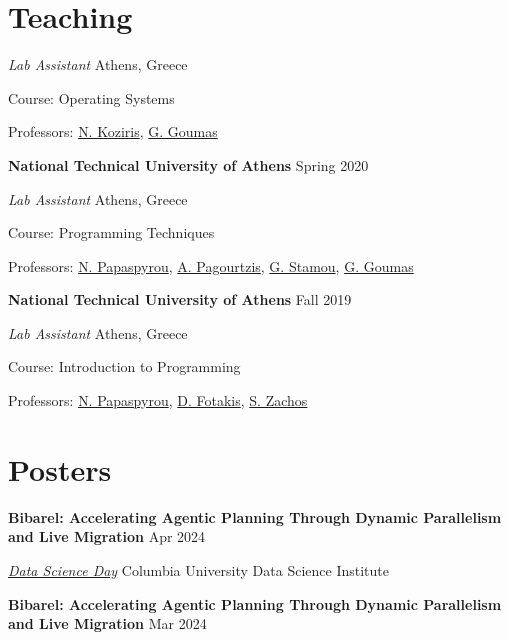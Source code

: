 \documentclass[margin,12pt]{resume}
\newcommand{\subsectionVSpace}{\vspace{3.5ex}\xspace}
\newcommand{\sectionVSpace}{\vspace{1ex}\xspace} %
\newcommand{\sectionVSpaceCorrection}{\vspace{-3.5ex}} %
\newcommand{\header}[1]{\textbf{#1}\xspace}
\newcommand{\event}[1]{\textit{#1}\xspace}
\newcommand{\institution}[1]{\header{#1}\xspace}
\newcommand{\place}[1]{#1\xspace}
\newcommand{\poster}[1]{\header{#1}\xspace}
\newcommand{\role}[1]{\textit{#1}\xspace}
\newcommand{\singleDate}[1]{#1\xspace}
\newcommand{\stitle}[1]{#1:\xspace}
\newenvironment{rSubsection}{}{\par\subsectionVSpace}
\newenvironment{rSection}[1]{\sectionVSpaceCorrection\section{#1}\xspace}{\sectionVSpace\par}
\begin{document}
\begin{resume}
\begin{rSection}{Teaching}
\begin{rSubsection}
            \role{Lab Assistant} \hfill \place{Athens, Greece}

            \stitle{Course} Operating Systems

            \stitle{Professors} \href{http://www.cslab.ntua.gr/~nkoziris/}{N. Koziris}, \href{http://www.cslab.ntua.gr/~goumas/}{G. Goumas}
        \end{rSubsection}

        \begin{rSubsection}
            \institution{National Technical University of Athens} \hfill \singleDate{Spring 2020}

            \role{Lab Assistant} \hfill \place{Athens, Greece}

            \stitle{Course} Programming Techniques

            \stitle{Professors} \href{http://www.softlab.ntua.gr/~nickie/}{N. Papaspyrou}, \href{http://users.softlab.ntua.gr/~pagour/}{A. Pagourtzis}, \href{http://www.image.ntua.gr/~gstam/}{G. Stamou}, \href{http://www.cslab.ntua.gr/~goumas/}{G. Goumas}
        \end{rSubsection}

        \begin{rSubsection}
            \institution{National Technical University of Athens} \hfill \singleDate{Fall 2019}

            \role{Lab Assistant} \hfill \place{Athens, Greece}

            \stitle{Course} Introduction to Programming

            \stitle{Professors} \href{http://www.softlab.ntua.gr/~nickie/}{N. Papaspyrou}, \href{http://www.softlab.ntua.gr/~fotakis/}{D. Fotakis}, \href{https://en.wikipedia.org/wiki/Stathis_Zachos}{S. Zachos}
        \end{rSubsection}
    \end{rSection}

    \begin{rSection}{Posters}
        \begin{rSubsection}
            \poster{Bibarel: Accelerating Agentic Planning Through Dynamic Parallelism and Live Migration} \hfill Apr 2024

            \event{\href{https://datascience.columbia.edu/event/data-science-day-2025/}{Data Science Day}} \hfill \place{Columbia University Data Science Institute}
        \end{rSubsection}

        \begin{rSubsection}
            \poster{Bibarel: Accelerating Agentic Planning Through Dynamic Parallelism and Live Migration} \hfill Mar 2024


\end{rSubsection}
\end{rSection}
\end{resume}
\end{document}
